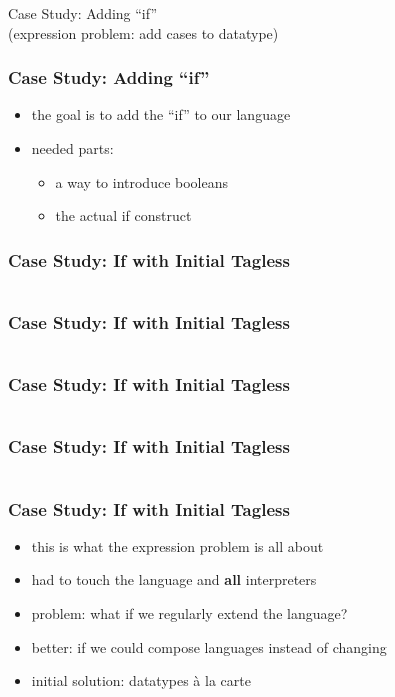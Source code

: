 \documentclass[aspectratio=169, hyperref={colorlinks, linkcolor=beamer@centricgreen}, urlcolor=links]{beamer}
\begin{document}
\begin{frame}
  \begin{center}
    {
      \Huge
      Case Study: Adding ``if''\\
    }
    (expression problem: add cases to datatype)
  \end{center}
\end{frame}

\begin{frame}
  \frametitle{Case Study: Adding ``if''}
  \begin{itemize}
  \item the goal is to add the ``if'' to our language
  \item needed parts:
    \begin{itemize}
    \item a way to introduce booleans
    \item the actual if construct
    \end{itemize}
  \end{itemize}
\end{frame}

\begin{frame}[fragile]
  \frametitle{Case Study: If with Initial Tagless}
  \inputminted[highlightlines={8-13}, fontsize=\footnotesize]{scala}{snippets/initial-tagless-expr-if.scala}
\end{frame}

\begin{frame}[fragile]
  \frametitle{Case Study: If with Initial Tagless}
  \inputminted[fontsize=\footnotesize]{scala}{snippets/initial-tagless-sample-if.scala}
\end{frame}

\begin{frame}[fragile]
  \frametitle{Case Study: If with Initial Tagless}
  \inputminted[highlightlines={8}, fontsize=\footnotesize]{scala}{snippets/initial-tagless-interp-if.scala}
\end{frame}

\begin{frame}[fragile]
  \frametitle{Case Study: If with Initial Tagless}
  \inputminted[fontsize=\footnotesize]{scala}{snippets/initial-tagless-handle-if.scala}
\end{frame}

\begin{frame}
  \frametitle{Case Study: If with Initial Tagless}
  \begin{itemize}
  \item this is what the expression problem is all about
  \item had to touch the language and \textbf{all} interpreters
  \item problem: what if we regularly extend the language?
  \item better: if we could compose languages instead of changing
  \item initial solution: datatypes \`{a} la carte
  \end{itemize}
\end{frame}
\end{document}
